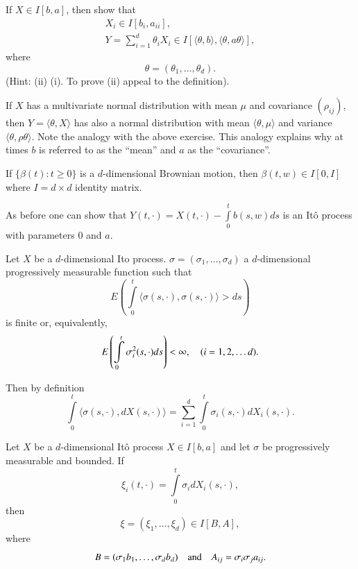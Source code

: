 \setcounter{exercise}{0}
\begin{exercise}\label{chap13-exer1}
If $X\in I[b,a]$, then show that
\begin{gather*}
X_{i}\in I[b_{i},a_{ii}],\tag{i}\\
Y=\sum\limits^{d}_{i=1}\theta_{i}X_{i}\in I[\langle \theta,b\rangle,
  \langle \theta,a\theta\rangle],\tag{ii}
\end{gather*}
where
$$
\theta=(\theta_{1},\ldots,\theta_{d}).
$$
(Hint: (ii) (i). To prove (ii) appeal to the definition).
\end{exercise}

\begin{remark*}
If $X$ has a multivariate normal distribution with mean $\mu$ and
covariance $(\rho_{ij})$, then $Y=\langle \theta,X\rangle$ has also a
normal distribution with mean $\langle\theta,\mu\rangle$ and variance
$\langle \theta,\rho\theta\rangle$. Note the analogy with the above
exercise. This analogy explains why at times $b$ is referred to as the
``mean'' and $a$ as the ``covariance''.
\end{remark*}

\begin{exercise}\label{chap13-exer2}
If $\{\beta(t):t\geq 0\}$ is a $d$-dimensional Brownian motion, then
$\beta(t,w)\in I[0,I]$ where $I=d\times d$ identity matrix.

As before one can show that
$Y(t,\cdot)=X(t,\cdot)-\int\limits^{t}_{0}b(s,w)ds$ is an It\^o
process with parameters $0$ and $a$.
\end{exercise}

\begin{defi*}
Let $X$ be a $d$-dimensional Ito
process. $\sigma=(\sigma_{1},\ldots,\sigma_{d})$ a $d$-dimensional
progressively measurable function such that
$$
E\left(\int\limits^{t}_{0}\langle
\sigma(s,\cdot),\sigma(s,\cdot)\rangle> ds\right)
$$
is finite or, equivalently,
$$
E\left(\int\limits^{t}_{0}\sigma^{2}_{i}(s,\cdot)ds\right)<\infty,\quad
(i=1,2,\ldots d).
$$\pageoriginale

Then by definition
$$
\int\limits^{t}_{0}\langle \sigma(s,\cdot),dX(s,\cdot)\rangle
=\sum\limits^{d}_{i=1}\int\limits^{t}_{0}\sigma_{i}(s,\cdot)dX_{i}(s,\cdot).
$$
\end{defi*}

\begin{prop*}
Let $X$ be a $d$-dimensional It\^o process $X\in I[b,a]$ and let
$\sigma$ be progressively measurable and bounded. If
$$
\xi_{i}(t,\cdot)=\int\limits^{t}_{0}\sigma_{i}dX_{i}(s,\cdot),
$$
then
$$
\xi=(\xi_{1},\ldots,\xi_{d})\in I[B,A],
$$
where
$$
B=(\sigma_{1}b_{1},\ldots,\sigma_{d}b_{d})\quad\text{and}\quad
A_{ij}=\sigma_{i}\sigma_{j}a_{ij}. 
$$
\end{prop*}

